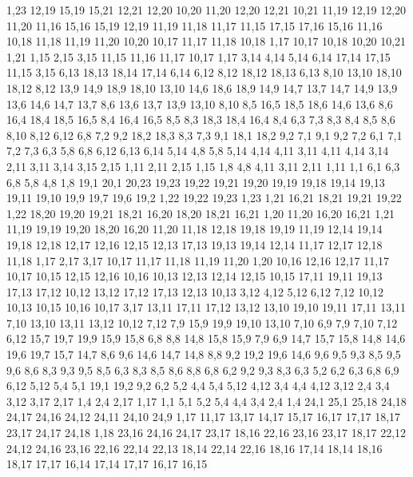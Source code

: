 1,23
%
12,19
15,19
15,21
12,21
12,20
%
10,20
11,20
12,20
12,21
10,21
%
11,19
12,19
12,20
11,20
%
11,16
15,16
15,19
12,19
11,19
11,18
11,17
%
11,15
17,15
17,16
15,16
11,16
%
10,18
11,18
11,19
11,20
10,20
%
10,17
11,17
11,18
10,18
%
1,17
10,17
10,18
10,20
10,21
1,21
%
1,15
2,15
3,15
11,15
11,16
11,17
10,17
1,17
%
3,14
4,14
5,14
6,14
17,14
17,15
11,15
3,15
%
6,13
18,13
18,14
17,14
6,14
%
6,12
8,12
18,12
18,13
6,13
%
8,10
13,10
18,10
18,12
8,12
%
13,9
14,9
18,9
18,10
13,10
%
14,6
18,6
18,9
14,9
14,7
%
13,7
14,7
14,9
13,9
%
13,6
14,6
14,7
13,7
%
8,6
13,6
13,7
13,9
13,10
8,10
%
8,5
16,5
18,5
18,6
14,6
13,6
8,6
%
16,4
18,4
18,5
16,5
%
8,4
16,4
16,5
8,5
%
8,3
18,3
18,4
16,4
8,4
%
6,3
7,3
8,3
8,4
8,5
8,6
8,10
8,12
6,12
6,8
%
7,2
9,2
18,2
18,3
8,3
7,3
%
9,1
18,1
18,2
9,2
%
7,1
9,1
9,2
7,2
%
6,1
7,1
7,2
7,3
6,3
%
5,8
6,8
6,12
6,13
6,14
5,14
%
4,8
5,8
5,14
4,14
4,11
%
3,11
4,11
4,14
3,14
%
2,11
3,11
3,14
3,15
2,15
%
1,11
2,11
2,15
1,15
%
1,8
4,8
4,11
3,11
2,11
1,11
%
1,1
6,1
6,3
6,8
5,8
4,8
1,8
19,1
20,1
20,23
19,23
19,22
19,21
19,20
19,19
19,18
19,14
19,13
19,11
19,10
19,9
19,7
19,6
19,2
%
1,22
19,22
19,23
1,23
%
1,21
16,21
18,21
19,21
19,22
1,22
%
18,20
19,20
19,21
18,21
%
16,20
18,20
18,21
16,21
%
1,20
11,20
16,20
16,21
1,21
%
11,19
19,19
19,20
18,20
16,20
11,20
%
11,18
12,18
19,18
19,19
11,19
%
12,14
19,14
19,18
12,18
12,17
12,16
12,15
%
12,13
17,13
19,13
19,14
12,14
%
11,17
12,17
12,18
11,18
%
1,17
2,17
3,17
10,17
11,17
11,18
11,19
11,20
1,20
%
10,16
12,16
12,17
11,17
10,17
%
10,15
12,15
12,16
10,16
%
10,13
12,13
12,14
12,15
10,15
%
17,11
19,11
19,13
17,13
17,12
%
10,12
13,12
17,12
17,13
12,13
10,13
%
3,12
4,12
5,12
6,12
7,12
10,12
10,13
10,15
10,16
10,17
3,17
%
13,11
17,11
17,12
13,12
%
13,10
19,10
19,11
17,11
13,11
%
7,10
13,10
13,11
13,12
10,12
7,12
%
7,9
15,9
19,9
19,10
13,10
7,10
%
6,9
7,9
7,10
7,12
6,12
%
15,7
19,7
19,9
15,9
15,8
%
6,8
8,8
14,8
15,8
15,9
7,9
6,9
%
14,7
15,7
15,8
14,8
%
14,6
19,6
19,7
15,7
14,7
%
8,6
9,6
14,6
14,7
14,8
8,8
%
9,2
19,2
19,6
14,6
9,6
9,5
9,3
%
8,5
9,5
9,6
8,6
%
8,3
9,3
9,5
8,5
%
6,3
8,3
8,5
8,6
8,8
6,8
%
6,2
9,2
9,3
8,3
6,3
%
5,2
6,2
6,3
6,8
6,9
6,12
5,12
5,4
%
5,1
19,1
19,2
9,2
6,2
5,2
%
4,4
5,4
5,12
4,12
%
3,4
4,4
4,12
3,12
%
2,4
3,4
3,12
3,17
2,17
%
1,4
2,4
2,17
1,17
%
1,1
5,1
5,2
5,4
4,4
3,4
2,4
1,4
24,1
25,1
25,18
24,18
24,17
24,16
24,12
24,11
24,10
24,9
%
1,17
11,17
13,17
14,17
15,17
16,17
17,17
18,17
23,17
24,17
24,18
1,18
%
23,16
24,16
24,17
23,17
%
18,16
22,16
23,16
23,17
18,17
%
22,12
24,12
24,16
23,16
22,16
22,14
22,13
%
18,14
22,14
22,16
18,16
%
17,14
18,14
18,16
18,17
17,17
%
16,14
17,14
17,17
16,17
16,15
